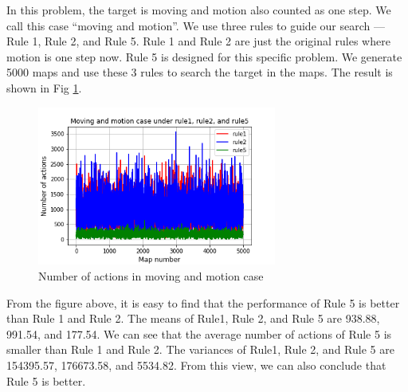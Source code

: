 \documentclass[letter]{article}
\begin{document}
\begin{enumerate}
	In this problem, the target is moving and motion also counted as one step. We call this
	case “moving and motion”. We use three rules to guide our search --- Rule 1, Rule 2, and
	Rule 5. Rule 1 and Rule 2 are just the original rules where motion is one step now. Rule 5
	is designed for this specific problem. We generate 5000 maps and use these 3 rules to
	search the target in the maps. The result is shown in Fig \ref{fig:part2-last.png}.
	
	
	\begin{figure}[H]
		\centering
		\includegraphics[width=0.7\textwidth]{fig/part2-last.png}
		\caption{Number of actions in moving and motion case}
		\label{fig:part2-last.png}
	\end{figure}
	
	From the figure above, it is easy to find that the performance of Rule 5 is better than Rule
	1 and Rule 2. The means of Rule1, Rule 2, and Rule 5 are 938.88, 991.54, and 177.54.
	We can see that the average number of actions of Rule 5 is smaller than Rule 1 and Rule
	2. The variances of Rule1, Rule 2, and Rule 5 are 154395.57, 176673.58, and 5534.82.
	From this view, we can also conclude that Rule 5 is better.
	
\end{enumerate}
\end{document}
